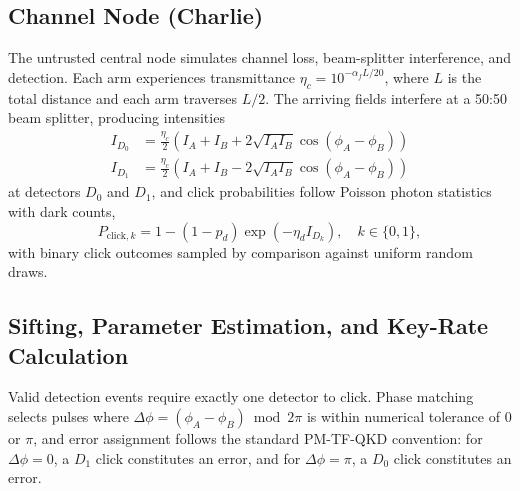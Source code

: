 \documentclass[12pt, a4paper]{report}
\begin{document}
\subsection{Channel Node (Charlie)}
The untrusted central node simulates channel loss, beam-splitter interference, and detection. Each arm experiences transmittance $\eta_c = 10^{-\alpha_f L / 20}$, where $L$ is the total distance and each arm traverses $L/2$. The arriving fields interfere at a 50:50 beam splitter, producing intensities
\begin{align}
    I_{D_0} &= \frac{\eta_c}{2}\left(I_A + I_B + 2\sqrt{I_A I_B}\cos(\phi_A - \phi_B)\right) \\
    I_{D_1} &= \frac{\eta_c}{2}\left(I_A + I_B - 2\sqrt{I_A I_B}\cos(\phi_A - \phi_B)\right)
\end{align}
at detectors $D_0$ and $D_1$, and click probabilities follow Poisson photon statistics with dark counts,
\begin{equation}
    P_{\text{click},k} = 1 - (1 - p_d)\exp(-\eta_d I_{D_k}), \quad k \in \{0, 1\},
\end{equation}
with binary click outcomes sampled by comparison against uniform random draws.

\subsection{Sifting, Parameter Estimation, and Key-Rate Calculation}
Valid detection events require exactly one detector to click. Phase matching selects pulses where $\Delta\phi = (\phi_A - \phi_B) \bmod 2\pi$ is within numerical tolerance of $0$ or $\pi$, and error assignment follows the standard PM-TF-QKD convention: for $\Delta\phi = 0$, a $D_1$ click constitutes an error, and for $\Delta\phi = \pi$, a $D_0$ click constitutes an error.
\end{document}
